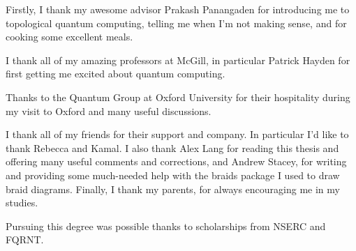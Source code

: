 Firstly, I thank my awesome advisor Prakash Panangaden for introducing me to
topological quantum computing, telling me when I'm not making sense, and
for cooking some excellent meals.

I thank all of my amazing professors at McGill, in particular Patrick
Hayden for first getting me excited about quantum computing.

Thanks to the Quantum Group at Oxford University for their hospitality during
my visit to Oxford and many useful discussions.

I thank all of my friends for their support and company. In particular I'd like
to thank Rebecca and Kamal. I also thank Alex Lang for
reading this thesis and offering many useful comments and corrections, and
Andrew Stacey, for writing and providing some much-needed help with the braids
package I used to draw braid diagrams.  Finally, I thank my parents, for always
encouraging me in my studies. 

Pursuing this degree was possible thanks to scholarships from NSERC and FQRNT.
